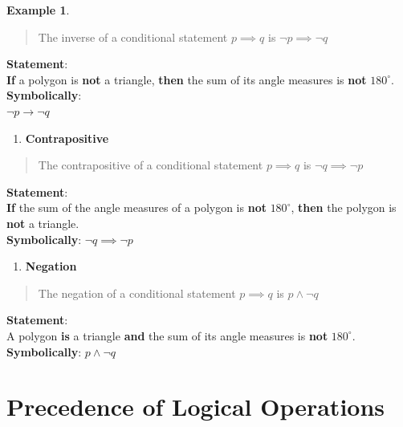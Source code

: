 \documentclass[
]{book}
\providecommand{\tightlist}{%
  \setlength{\itemsep}{0pt}\setlength{\parskip}{0pt}}
\theoremstyle{definition}
\theoremstyle{definition}
\newtheorem{example}{Example}[chapter]
\theoremstyle{definition}
\theoremstyle{definition}
\theoremstyle{remark}
\begin{document}
\begin{example}
\begin{quote}
The inverse of a conditional statement \(p \implies q\) is \(\neg p \implies \neg q\)
\end{quote}

\textbf{Statement}:\\
\textbf{If} a polygon is \textbf{not} a triangle, \textbf{then} the sum of its angle measures is \textbf{not} \(180^\circ\).\\
\textbf{Symbolically}:\\
\(\neg p \rightarrow \neg q\)

\begin{enumerate}
\def\labelenumi{(\roman{enumi})}
\setcounter{enumi}{3}
\tightlist
\item
  \textbf{Contrapositive}
\end{enumerate}

\begin{quote}
The contrapositive of a conditional statement \(p \implies q\) is \(\neg q \implies \neg p\)
\end{quote}

\textbf{Statement}:\\
\textbf{If} the sum of the angle measures of a polygon is \textbf{not} \(180^\circ\), \textbf{then} the polygon is \textbf{not} a triangle.\\
\textbf{Symbolically}: \(\neg q \implies \neg p\)

\begin{enumerate}
\def\labelenumi{(\alph{enumi})}
\setcounter{enumi}{21}
\tightlist
\item
  \textbf{Negation}
\end{enumerate}

\begin{quote}
The negation of a conditional statement \(p \implies q\) is \(p \land \neg q\)
\end{quote}

\textbf{Statement}:\\
A polygon \textbf{is} a triangle \textbf{and} the sum of its angle measures is \textbf{not} \(180^\circ\).\\
\textbf{Symbolically}: \(p \land \neg q\)

\end{example}

\section{Precedence of Logical Operations}\label{precedence-of-logical-operations}
\end{document}

